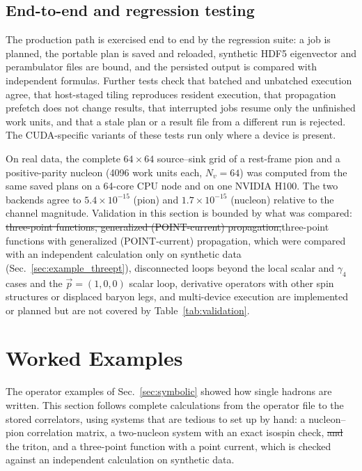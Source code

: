 \documentclass[a4paper,fleqn]{cas-dc}
\newcommand{\del}[1]{{\color{red}\sout{#1}}}
\newcommand{\add}[1]{{\color{blue}#1}}
\begin{document}
\subsection{End-to-end and regression testing}
\label{sec:validation_end_to_end}

The production path is exercised end to end by the regression suite: a job is
planned, the portable plan is saved and reloaded, synthetic HDF5 eigenvector and
perambulator files are bound, and the persisted output is compared with
independent formulas. Further tests check that batched and unbatched execution
agree, that host-staged tiling reproduces resident execution, that propagation
prefetch does not change results, that interrupted jobs resume only the
unfinished work units, and that a stale plan or a result file from a different
run is rejected. The CUDA-specific variants of these tests run only where a
device is present.

On real data, the complete \(64\times64\) source--sink grid of a rest-frame
pion and a positive-parity nucleon (4096 work units each, \(N_v=64\)) was
computed from the same saved plans on a 64-core CPU node and on one NVIDIA H100.
The two backends agree to \(5.4\times10^{-15}\) (pion) and \(1.7\times10^{-15}\)
(nucleon) relative to the channel magnitude. Validation in this section is
bounded by what was compared: \del{three-point functions, generalized (POINT-current)
propagation,}\add{three-point functions with generalized (POINT-current) propagation,
which were compared with an independent calculation only on synthetic data
(Sec.~\ref{sec:example_threept}),} disconnected loops beyond the local scalar and \(\gamma_4\) cases and
the \(\vec p=(1,0,0)\) scalar loop, derivative operators with other spin
structures or displaced baryon legs, and multi-device execution are implemented
or planned but are not covered by Table~\ref{tab:validation}.

\section{Worked Examples}
\label{sec:examples}

The operator examples of Sec.~\ref{sec:symbolic} showed how single hadrons are
written. This section follows complete calculations from the operator file to
the stored correlators, using systems that are tedious to set up by hand: a
nucleon--pion correlation matrix, a two-nucleon system with an exact isospin
check, \del{and }the triton\add{, and a three-point function with a point current,
which is checked against an independent calculation on synthetic data}.
\end{document}
